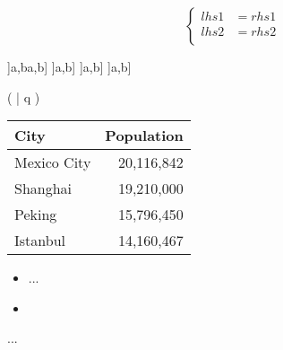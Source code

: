 
\begin{equation}
    \left\{
        \begin{aligned}
            lhs1 &= rhs1 \\
            lhs2 &= rhs2 \\
        \end{aligned}
    \right.
\end{equation}

\left]a,b\right[
\bigl]a,b\bigr]
\Bigl]a,b\Bigr]
\biggl]a,b\biggr]
\Biggl]a,b\Biggr]

\left(  \middle| q \right)

    \begin{tabular}{@{} lr @{}}
      \toprule
      City & Population\\
      \midrule
      Mexico City & 20,116,842\\
      Shanghai & 19,210,000\\
      Peking & 15,796,450\\
      Istanbul & 14,160,467\\
      \bottomrule
    \end{tabular}

\begin{itemize}
\item
...
\item
\end{itemize}

\ifpdf
{}
\else
{}
\fi

\makeatletter
\makeatother
\begingroup ...\endgroup

